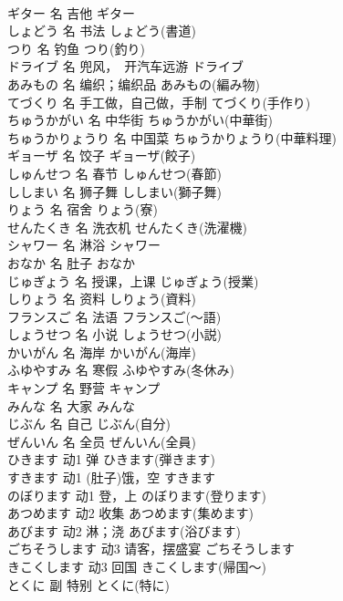 \documentclass[8pt]{extreport}
\begin{document}
\begin{CJK}{UTF8}{min}
\\	ギター	名	吉他	ギター	
\\	しょどう	名	书法	しょどう(書道)	
\\	つり	名	钓鱼	つり(釣り)	
\\	ドライブ	名	兜风，　开汽车远游	ドライブ	
\\	あみもの	名	编织；编织品	あみもの(編み物)	
\\	てづくり	名	手工做，自己做，手制	てづくり(手作り)	
\\	ちゅうかがい	名	中华街	ちゅうかがい(中華街)	
\\	ちゅうかりょうり	名	中国菜	ちゅうかりょうり(中華料理)	
\\	ギョーザ	名	饺子	ギョーザ(餃子)	
\\	しゅんせつ	名	春节	しゅんせつ(春節)	
\\	ししまい	名	狮子舞	ししまい(獅子舞)	
\\	りょう	名	宿舍	りょう(寮)	
\\	せんたくき	名	洗衣机	せんたくき(洗濯機)	
\\	シャワー	名	淋浴	シャワー	
\\	おなか	名	肚子	おなか	
\\	じゅぎょう	名	授课，上课	じゅぎょう(授業)	
\\	しりょう	名	资料	しりょう(資料)	
\\	フランスご	名	法语	フランスご(～語)	
\\	しょうせつ	名	小说	しょうせつ(小説)	
\\	かいがん	名	海岸	かいがん(海岸)	
\\	ふゆやすみ	名	寒假	ふゆやすみ(冬休み)	
\\	キャンプ	名	野营	キャンプ	
\\	みんな	名	大家	みんな	
\\	じぶん	名	自己	じぶん(自分)	
\\	ぜんいん	名	全员	ぜんいん(全員)	
\\	ひきます	动1	弹	ひきます(弾きます)	
\\	すきます	动1	(肚子)饿，空	すきます	
\\	のぼります	动1	登，上	のぼります(登ります)	
\\	あつめます	动2	收集	あつめます(集めます)	
\\	あびます	动2	淋；浇	あびます(浴びます)	
\\	ごちそうします	动3	请客，摆盛宴	ごちそうします	
\\	きこくします	动3	回国	きこくします(帰国～)	
\\	とくに	副	特别	とくに(特に)	

\end{CJK}
\end{document}
